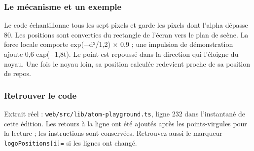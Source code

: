 \documentclass[
  canadien,
  11pt,
  letterpaper,
]{article}
\begin{document}
\subsubsection{Le mécanisme et un
exemple}\label{le-muxe9canisme-et-un-exemple-5}

Le code échantillonne tous les sept pixels et garde les pixels dont
l'alpha dépasse 80. Les positions sont converties du rectangle de
l'écran vers le plan de scène. La force locale comporte exp(−d²/1,2) ×
0,9 ; une impulsion de démonstration ajoute 0,6 exp(−1,8t). Le point est
repoussé dans la direction qui l'éloigne du noyau. Une fois le noyau
loin, sa position calculée redevient proche de sa position de repos.

\subsubsection{Retrouver le code}\label{retrouver-le-code-5}

Extrait réel : \texttt{web/src/lib/atom-playground.ts}, ligne 232 dans
l'instantané de cette édition. Les retours à la ligne ont été ajoutés
après les points-virgules pour la lecture ; les instructions sont
conservées. Retrouvez aussi le marqueur \texttt{logoPositions{[}i{]}=}
si les lignes ont changé.
\end{document}
